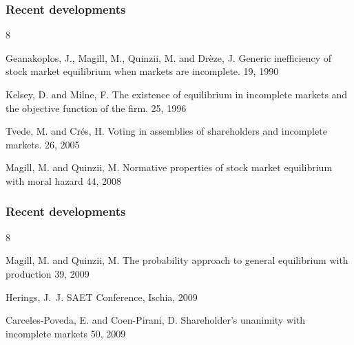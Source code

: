 \documentclass[blue]{beamer}
\theoremstyle{definition}
\theoremstyle{example}
\begin{document}

\begin{frame}\frametitle{Recent developments}


\begin{small}

\begin{thebibliography}{8}


  \beamertemplatearticlebibitems


    Geanakoplos, J., Magill, M., Quinzii, M. and Dr\`eze, J.
    \newblock Generic inefficiency of stock market equilibrium when markets are incomplete.
     19, 1990

   Kelsey, D. and Milne, F.
    \newblock The existence of equilibrium in incomplete markets and the objective function of the firm.
     25, 1996

   Tvede, M. and Cr\'es, H.
    \newblock Voting in assemblies of shareholders and incomplete markets.
     26, 2005

    Magill, M. and Quinzii, M.
    \newblock Normative properties of stock market equilibrium with moral hazard
     44, 2008


    \end{thebibliography}

\end{small}
\end{frame}


\begin{frame}\frametitle{Recent developments}

\begin{small}

\begin{thebibliography}{8}


  \beamertemplatearticlebibitems

    Magill, M. and Quinzii, M.
    \newblock The probability approach to general equilibrium with production
     39, 2009


    Herings, J.~J.
    \newblock  SAET Conference, Ischia, 2009

    Carceles-Poveda, E. and Coen-Pirani, D.
    \newblock Shareholder's unanimity with incomplete markets
     50, 2009



    \end{thebibliography}

\end{small}

\end{frame}
\end{document}
